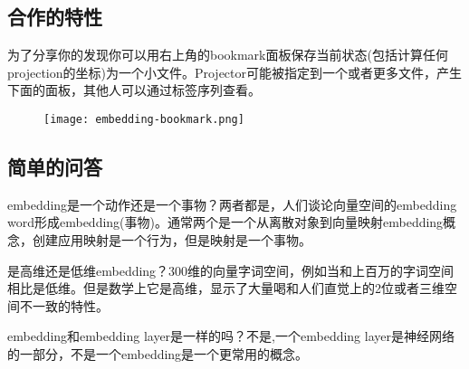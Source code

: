 \subsection{合作的特性}
为了分享你的发现你可以用右上角的bookmark面板保存当前状态(包括计算任何projection的坐标)为一个小文件。Projector可能被指定到一个或者更多文件，产生下面的面板，其他人可以通过标签序列查看。
\begin{figure}[H]
	\texttt{[image: embedding-bookmark.png]}
\end{figure}
\subsection{简单的问答}
embedding是一个动作还是一个事物？两者都是，人们谈论向量空间的embedding word形成embedding(事物)。通常两个是一个从离散对象到向量映射embedding概念，创建应用映射是一个行为，但是映射是一个事物。

是高维还是低维embedding？300维的向量字词空间，例如当和上百万的字词空间相比是低维。但是数学上它是高维，显示了大量喝和人们直觉上的2位或者三维空间不一致的特性。

embedding和embedding layer是一样的吗？不是,一个embedding layer是神经网络的一部分，不是一个embedding是一个更常用的概念。
